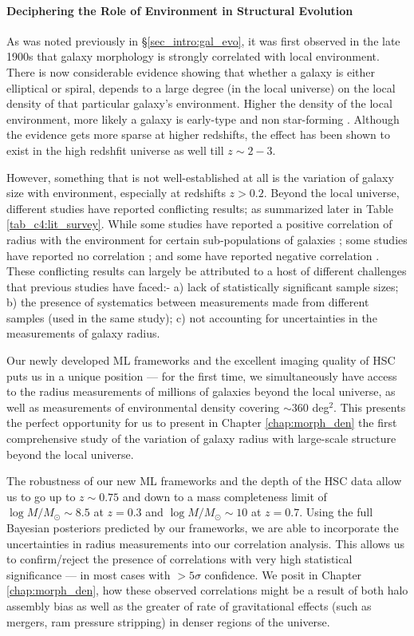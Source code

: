 \paragraph{Deciphering the Role of Environment in Structural Evolution} As was noted previously in \S \ref{sec_intro:gal_evo}, it was first observed in the late 1900s that galaxy morphology is strongly correlated with local environment. There is now considerable evidence showing that whether a galaxy is either elliptical or spiral, depends to a large degree (in
the local universe) on the local density of that particular galaxy’s environment. Higher the density of the local environment, more likely a galaxy is early-type and non star-forming \citep[e.g.,][]{dressler_84, gomez_03, blanton_09}. Although the evidence gets more sparse at higher redshifts, the effect has been shown to exist in the high redshfit universe as well till $z\sim2-3$.

However, something that is not well-established at all is the variation of galaxy size with environment, especially at redshifts $z > 0.2$. Beyond the local universe, different studies have reported conflicting results; as summarized later in Table \ref{tab_c4:lit_survey}. While some studies have reported a positive correlation of radius with the environment for certain sub-populations of galaxies \citep[e.g.,][]{Cooper12,Lani13,Bassett13,Afonso19,Siudek22}; some studies have reported no correlation \citep[e.g.,][]{Huertas-Company13,Kelkar15,Gu21}; and some have reported negative correlation \citep[e.g.,][]{Matharu19,Chan18}. These conflicting results can largely be attributed to a host of different challenges that previous studies have faced:- a) lack of statistically significant sample sizes; b) the presence of systematics between measurements made from different samples (used in the same study);  c) not accounting for uncertainties in the measurements of galaxy radius. 

Our newly developed ML frameworks and the excellent imaging quality of HSC puts us in a unique position --- for the first time, we simultaneously have access to the radius measurements of millions of galaxies beyond the local universe, as well as measurements of environmental density covering $\sim360$ deg$^2$. This presents the perfect opportunity for us to present in Chapter \ref{chap:morph_den} the first comprehensive study of the variation of galaxy radius with large-scale structure beyond the local universe. 

The robustness of our new ML frameworks and the depth of the HSC data allow us to go up to $z\sim0.75$ and down to a mass completeness limit of $\log M/M_{\odot} \sim 8.5$ at $z=0.3$ and $\log M/M_{\odot} \sim 10$ at $z=0.7$. Using the full Bayesian posteriors predicted by our frameworks, we are able to incorporate the uncertainties in radius measurements into our correlation analysis. This allows us to confirm/reject the presence of correlations with very high statistical significance --- in most cases with $>5\sigma$ confidence. We posit in Chapter \ref{chap:morph_den}, how these observed correlations might be a result of both halo assembly bias as well as the greater of rate of gravitational effects (such as mergers, ram pressure stripping) in denser regions of the universe. 


